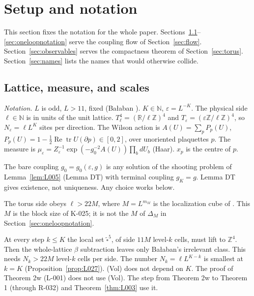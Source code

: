 \section{Setup and notation}\label{sec:setup}

This section fixes the notation for the whole paper. Sections~\ref{sec:lattice}--\ref{sec:oneloopnotation} serve the coupling flow of Section~\ref{sec:flow}. Section~\ref{sec:observables} serves the compactness theorem of Section~\ref{sec:torus}. Section~\ref{sec:names} lists the names that would otherwise collide.

\subsection{Lattice, measure, and scales}\label{sec:lattice}

\emph{Notation.} $L$ is odd, $L>11$, fixed (Ba{\l}aban \cite[p.~256]{balaban109}). $K\in\mathbb N$, $\varepsilon=L^{-K}$. The physical side $\ell\in\mathbb N$ is in units of the unit lattice. $T^4_\ell=(\mathbb R/\ell\mathbb Z)^4$ and $T_\varepsilon=(\varepsilon\mathbb Z/\ell\mathbb Z)^4$, so $N_\varepsilon=\ell L^K$ sites per direction. The Wilson action is $A(U)=\sum_p P_p(U)$, $P_p(U)=1-\tfrac12\operatorname{Re}\operatorname{tr}U(\partial p)\in[0,2]$, over unoriented plaquettes $p$. The measure is $\mu_\varepsilon=Z_\varepsilon^{-1}\exp(-g_0^{-2}A(U))\prod_b dU_b$ (Haar). $x_p$ is the centre of $p$.

The bare coupling $g_0=g_0(\varepsilon,g)$ is any solution of the shooting problem of Lemma~\ref{lem:L005} (Lemma DT) with terminal coupling $g_K=g$. Lemma DT gives existence, not uniqueness. Any choice works below.

\begin{assumption}
The torus side obeys $\ell>22M$, where $M=L^{m_M}$ is the localization cube of \cite[p.~257]{balaban109}. This $M$ is the block size of K-025; it is not the $M$ of $\Delta_M$ in Section~\ref{sec:oneloopnotation}.
\end{assumption}
At every step $k\le K$ the local set $\tilde\square^5$, of side $11M$ level-$k$ cells, must lift to $\mathbb Z^4$. Then the whole-lattice $\beta$ subtraction leaves only Ba{\l}aban's irrelevant class. This needs $N_k>22M$ level-$k$ cells per side. The number $N_k=\ell L^{K-k}$ is smallest at $k=K$ (Proposition~\ref{prop:L027}). (Vol) does not depend on $K$. The proof of Theorem 2w (L-001) does not use (Vol). The step from Theorem 2w to Theorem 1 (through R-032) and Theorem~\ref{thm:L003} use it.


